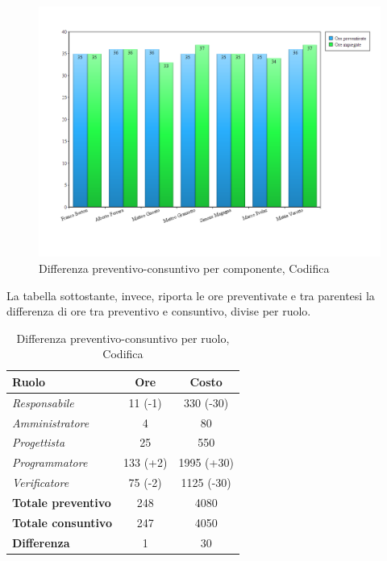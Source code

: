 \begin{figure}[H]
	\centering
	\includegraphics[scale=0.4]{immagini/Grafi/Codifica_oreComponente.png}
	\caption{Differenza preventivo-consuntivo per componente, Codifica}
\end{figure}
\FloatBarrier

\newpage
La tabella sottostante, invece, riporta le ore preventivate e  tra parentesi la differenza di ore tra preventivo e consuntivo, divise per ruolo.

\begin{table}[H]
	\begin{center}
		\begin{tabular}{|l|c|c|}
			\hline
			\textbf{Ruolo}	& \textbf{Ore} & \textbf{Costo} 		\\
			\hline
			\textit{Responsabile}		&	11 (-1)	&	330 (-30)	\\
			\hline
			\textit{Amministratore}		&	4		&	80			\\
			\hline
			\textit{Progettista}		&	25		&	550			\\
			\hline
			\textit{Programmatore}		&	133	(+2)&	1995 (+30)	\\
			\hline
			\textit{Verificatore}		&	75	(-2)&	1125 (-30)	\\
			\hline
			\textbf{Totale preventivo}	&	248		& 	4080		\\
			\hline
			\textbf{Totale consuntivo}	&	247		&  	4050		\\
			\hline
			\textbf{Differenza} 		&	1		&	30			\\
			\hline
		\end{tabular}
	\end{center}
	\caption{Differenza preventivo-consuntivo per ruolo, Codifica}
\end{table}

